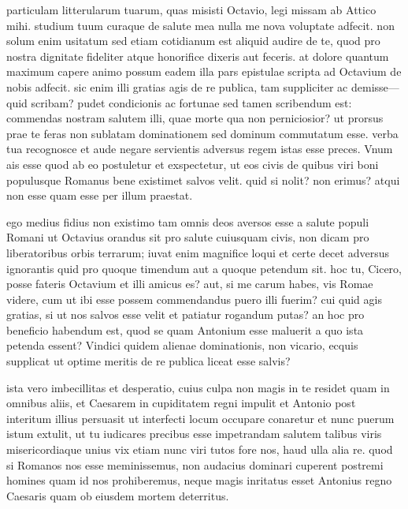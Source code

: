 


 particulam litterularum tuarum, quas misisti Octavio, legi missam ab Attico mihi. studium tuum curaque de salute mea nulla me nova voluptate adfecit. non solum enim usitatum sed etiam cotidianum est aliquid audire de te, quod pro nostra dignitate fideliter atque honorifice dixeris aut feceris. at dolore quantum maximum capere animo possum eadem illa pars epistulae scripta ad Octavium de nobis adfecit. sic enim illi gratias agis de re publica, tam suppliciter ac demisse—quid scribam? pudet condicionis ac fortunae sed tamen scribendum est: commendas nostram salutem illi, quae morte qua non perniciosior? ut prorsus prae te feras non sublatam dominationem sed dominum commutatum esse. verba tua recognosce et aude negare servientis adversus regem istas esse preces. Vnum ais esse quod ab eo postuletur et exspectetur, ut eos civis de quibus viri boni populusque Romanus bene existimet salvos velit. quid si nolit? non erimus? atqui non esse quam esse per illum praestat.

 ego medius fidius non existimo tam omnis deos aversos esse a salute populi Romani ut Octavius orandus sit pro salute cuiusquam civis, non dicam pro liberatoribus orbis terrarum; iuvat enim magnifice loqui et certe decet adversus ignorantis quid pro quoque timendum aut a quoque petendum sit. hoc tu, Cicero, posse fateris Octavium et illi amicus es? aut, si me carum habes, vis Romae videre, cum ut ibi esse possem commendandus puero illi fuerim? cui quid agis gratias, si ut nos salvos esse velit et patiatur rogandum putas? an hoc pro beneficio habendum est, quod se quam Antonium esse maluerit a quo ista petenda essent? Vindici quidem alienae dominationis, non vicario, ecquis supplicat ut optime meritis de re publica liceat esse salvis?

 ista vero imbecillitas et desperatio, cuius culpa non magis in te residet quam in omnibus aliis, et Caesarem in cupiditatem regni impulit et Antonio post interitum illius persuasit ut interfecti locum occupare conaretur et nunc puerum istum extulit, ut tu iudicares precibus esse impetrandam salutem talibus viris misericordiaque unius vix etiam nunc viri tutos fore nos, haud ulla alia re. quod si Romanos nos esse meminissemus, non audacius dominari cuperent postremi homines quam id nos prohiberemus, neque magis inritatus esset Antonius regno Caesaris quam ob eiusdem mortem deterritus.

